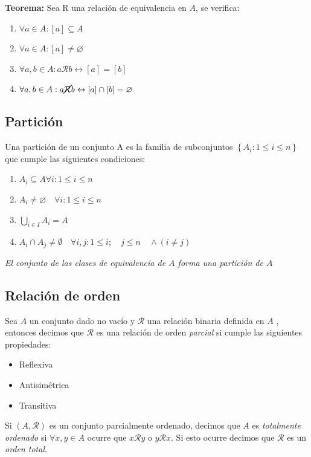 \textbf{Teorema:} Sea R una relación de equivalencia en $A$, se verifica:
\begin{enumerate}
	\item $\forall a \in A: \left[a\right] \subseteq A$
	\item $\forall a \in A: \left[a\right] \neq \varnothing$
	\item $\forall a,b \in A: a\mathcal{R} b \leftrightarrow \left[a\right] = \left[b\right]$
	\item $\forall a,b \in A: a \cancel{\mathcal{R}} b \leftrightarrow \left[a\right] \cap \left[b\right]= \varnothing$
\end{enumerate}

\subsection{Partición}
Una partición de un conjunto A es la familia de subconjuntos $\left\{ A_i: 1 \leq i \leq n\right\}$ que cumple las siguientes condiciones:
\begin{enumerate}
	\item $A_i \subseteq A \forall i: 1 \leq i \leq n$
	\item $A_i \neq \varnothing \quad \forall i: 1 \leq i \leq n$
	\item $\bigcup_{i\in I} A_i = A$
	\item $A_i \cap A_j \neq \emptyset \quad \forall i,j: 1\leq i ; \quad j \leq n	\quad \wedge (i \neq j)$
\end{enumerate}

\emph{El conjunto de las clases de equivalencia de $A$ forma una partición de $A$}

\subsection{Relación de orden}
Sea $A$ un conjunto dado no vacío y $\mathcal{R}$ una relación binaria definida en $A$ , entonces decimos que $\mathcal{R}$ es una relación de orden \emph{parcial} si cumple las siguientes propiedades:
\begin{itemize}
	\item Reflexiva
	\item Antisimétrica
	\item Transitiva
\end{itemize}

Si $(A,\mathcal{R})$ es un conjunto parcialmente ordenado, decimos que $A$ es \emph{totalmente ordenado} si $\forall x,y \in A$ ocurre que $x\mathcal{R}y$ o $y\mathcal{R}x$.
Si esto ocurre decimos que $\mathcal{R}$ es un \emph{orden total}.


